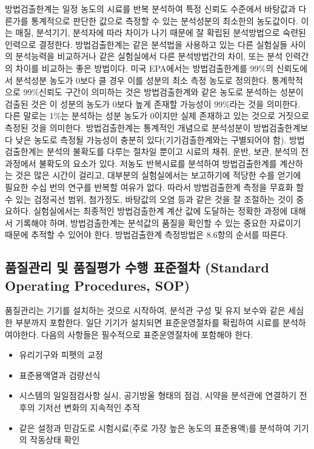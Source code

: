 \documentclass[
]{book}
\providecommand{\tightlist}{%
  \setlength{\itemsep}{0pt}\setlength{\parskip}{0pt}}
\begin{document}
방법검출한계는 일정 농도의 시료를 반복 분석하여 특정 신뢰도 수준에서 바탕값과 다른가를 통계적으로 판단한 값으로 측정할 수 있는 분석성분의 최소한의 농도값이다. 이는 매질, 분석기기, 분석자에 따라 차이가 나기 때문에 잘 확립된 분석방법으로 숙련된 인력으로 결정한다. 방법검출한계는 같은 분석법을 사용하고 있는 다른 실험실들 사이의 분석능력을 비교하거나 같은 실험실에서 다른 분석방법간의 차이, 또는 분석 인력간의 차이를 비교하는 좋은 방법이다. 미국 EPA에서는 방법검출한계를 99\%의 신뢰도에서 분석성분 농도가 0보다 클 경우 이를 성분의 최소 측정 농도로 정의한다. 통계학적으로 99\%신뢰도 구간이 의미하는 것은 방법검출한계와 같은 농도로 분석하는 성분이 검출된 것은 이 성분의 농도가 0보다 높게 존재할 가능성이 99\%라는 것을 의미한다. 다른 말로는 1\%는 분석하는 성분 농도가 0이지만 실제 존재하고 있는 것으로 거짓으로 측정된 것을 의미한다. 방법검출한계는 통계적인 개념으로 분석성분이 방법검출한계보다 낮은 농도로 측정될 가능성이 충분히 있다(기기검출한계와는 구별되어야 함). 방법검출한계는 분석의 불확도를 다루는 절차일 뿐이고 시료의 채취, 운반, 보관, 분석의 전 과정에서 불확도의 요소가 있다.
저농도 반복시료를 분석하여 방법검출한계를 계산하는 것은 많은 시간이 걸리고, 대부분의 실험실에서는 보고하기에 적당한 수를 얻기에 필요한 수십 번의 연구를 반복할 여유가 없다. 따라서 방법검출한계 측정을 무효화 할 수 있는 검정곡선 범위, 첨가정도, 바탕값의 오염 등과 같은 것을 잘 조절하는 것이 중요하다. 실험실에서는 최종적인 방법검출한계 계산 값에 도달하는 정확한 과정에 대해서 기록해야 하며, 방법검출한계는 분석값의 품질을 확인할 수 있는 중요한 자료이기 때문에 추적할 수 있어야 한다. 방법검출한계 측정방법은 8.6항의 순서를 따른다.

\hypertarget{uxd488uxc9c8uxad00uxb9ac-uxbc0f-uxd488uxc9c8uxd3c9uxac00-uxc218uxd589-uxd45cuxc900uxc808uxcc28-standard-operating-procedures-sop}{%
\subsection{품질관리 및 품질평가 수행 표준절차 (Standard Operating Procedures, SOP)}\label{uxd488uxc9c8uxad00uxb9ac-uxbc0f-uxd488uxc9c8uxd3c9uxac00-uxc218uxd589-uxd45cuxc900uxc808uxcc28-standard-operating-procedures-sop}}

품질관리는 기기를 설치하는 것으로 시작하여, 분석관 구성 및 유지 보수와 같은 세심한 부분까지 포함한다. 일단 기기가 설치되면 표준운영절차를 확립하여 시료를 분석하여야한다. 다음의 사항들은 필수적으로 표준운영절차에 포함해야 한다.

\begin{itemize}
\tightlist
\item
  유리기구와 피펫의 교정
\item
  표준용액열과 검량선식
\item
  시스템의 일일점검사항 실시, 공기방울 형태의 점검, 시약을 분석관에 연결하기 전후의 기저선 변화의 지속적인 추적
\item
  같은 설정과 민감도로 시험시료(주로 가장 높은 농도의 표준용액)를 분석하여 기기의 작동상태 확인
\end{itemize}
\end{document}
